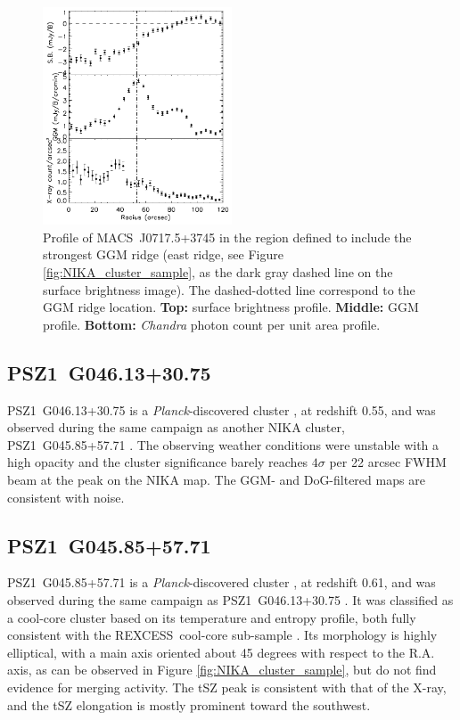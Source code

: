 \documentclass[traditabstract]{aa}
\newcommand{\rexcess}{{\gwpfont REXCESS}}
\begin{document}
\begin{figure}[h]
\center
\includegraphics[trim=0cm 0cm 0cm 0cm, clip=true, width=0.5\textwidth]{Figure/profile_MACSJ0717.pdf} 
\caption{\footnotesize{Profile of \mbox{MACS~J0717.5+3745} in the region defined to include the strongest GGM ridge (east ridge, see Figure \ref{fig:NIKA_cluster_sample}, as the dark gray dashed line on the surface brightness image). The dashed-dotted line correspond to the GGM ridge location. {\bf Top:} surface brightness profile. {\bf Middle:} GGM profile. {\bf Bottom:} \textit{Chandra} photon count per unit area profile.}}
\label{fig:profile_MACSJ0717}
\end{figure}


\subsection{PSZ1~G046.13+30.75}
\mbox{PSZ1~G046.13+30.75} is a \textit{Planck}-discovered cluster \citep{PlanckXXIX2014}, at redshift 0.55, and was observed during the same campaign as another NIKA cluster, \mbox{PSZ1~G045.85+57.71} \citep[see][for more details]{Ruppin2016}. The observing weather conditions were unstable with a high opacity and the cluster significance barely reaches $4 \sigma$ per 22 arcsec FWHM beam at the peak on the NIKA map. The GGM- and DoG-filtered maps are consistent with noise.

\subsection{PSZ1~G045.85+57.71}
\mbox{PSZ1~G045.85+57.71} is a \textit{Planck}-discovered cluster \citep{PlanckXXIX2014}, at redshift 0.61, and was observed during the same campaign as \mbox{PSZ1~G046.13+30.75} \citep[see][for more details]{Ruppin2016}. It was classified as a cool-core cluster based on its temperature and entropy profile, both fully consistent with the \rexcess\ cool-core sub-sample \citep{Bohringer2007,Arnaud2010,Pratt2010}. Its morphology is highly elliptical, with a main axis oriented about 45 degrees with respect to the R.A. axis, as can be observed in Figure \ref{fig:NIKA_cluster_sample}, but \cite{Ruppin2016} do not find evidence for merging activity. The tSZ peak is consistent with that of the X-ray, and the tSZ elongation is mostly prominent toward the southwest.
\end{document}
